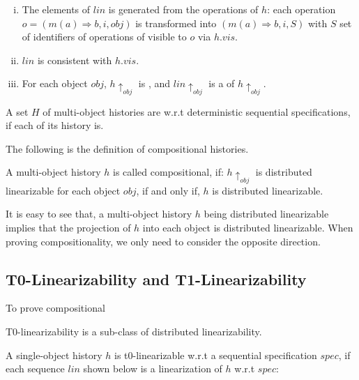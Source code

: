 {\begin{definition}
\begin{enumerate}[(i)]
\item The elements of $\mathit{lin}$ is generated from the operations of $h$: each operation $o = (m(a) \Rightarrow b,i,\mathit{obj})$ is transformed into $(m(a) \Rightarrow b,i,S)$ with $S$ set of identifiers of operations of visible to $o$ via $h.\mathit{vis}$.
\item $\mathit{lin}$ is consistent with $h. \mathit{vis}$.
\item For each object $\mathit{obj}$, $h \uparrow_{\mathit{obj}}$ is \crdtlinearizable{}, and $\mathit{lin} \uparrow_{ \mathit{obj} }$ is a \crdtlinearization{} of $h \uparrow_{\mathit{obj}}$.
\end{enumerate}

A set $H$ of multi-object histories are \crdtlinearizable{} w.r.t deterministic sequential specifications, if each of its history is.
\end{definition}

The following is the definition of compositional histories.

\begin{definition}[Compositionality]
\label{definition:compositionality}
A multi-object history $h$ is called compositional, if: $h \uparrow_{\mathit{obj}}$ is distributed linearizable for each object $\mathit{obj}$, if and only if, $h$ is distributed linearizable.
\end{definition}

It is easy to see that, a multi-object history $h$ being distributed linearizable implies that the projection of $h$ into each object is distributed linearizable. When proving compositionality, we only need to consider the opposite direction.




\subsection{T0-Linearizability and T1-Linearizability}
\label{subsec:t0-linearizability and t1-linearizability}

To prove compositional

T0-linearizability is a sub-class of distributed linearizability.

\begin{definition}[t0-linearizability]
\label{definition:t0-ilnearizability}
A single-object history $h$ is t0-linearizable w.r.t a sequential specification $\mathit{spec}$, if each sequence $\mathit{lin}$ shown below is a linearization of $h$ w.r.t $\mathit{spec}$:


\end{definition}}
